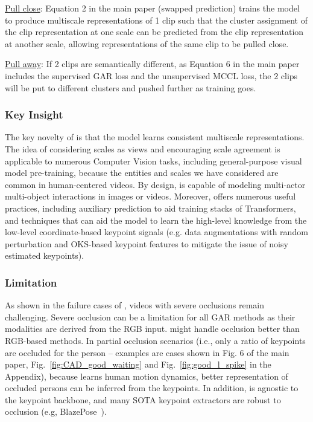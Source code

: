 \documentclass[runningheads]{llncs}
\begin{document}
\ul{Pull close}: Equation 2 in the main paper (swapped prediction)
trains the model to produce multiscale representations
of 1 clip such that the 
cluster assignment
of the clip representation at one scale can be predicted from the clip representation at another scale, allowing representations of the same clip to be pulled close.

\ul{Pull away}:
If 2 clips are semantically different,
as 
Equation 6 in the main paper
includes 
the supervised GAR loss and the unsupervised MCCL loss, the 2 clips  will be put
to different clusters
and
pushed 
further 
as training goes.







\subsubsection{Key Insight} 
The key novelty of \ours is that the model learns consistent multiscale representations. The idea of considering scales as views and encouraging scale agreement is applicable to numerous Computer Vision tasks, including general-purpose visual model pre-training, because the entities and scales we have considered are common in human-centered videos. By design, \ours is capable of modeling multi-actor multi-object interactions in images or videos. Moreover, \ours offers numerous useful practices, including  auxiliary prediction to aid training stacks of Transformers, and techniques that can aid the model to  learn the high-level knowledge from the low-level coordinate-based keypoint signals 
(e.g. data augmentations with random perturbation and OKS-based keypoint features to mitigate the issue of noisy estimated keypoints).

\subsubsection{Limitation}
As shown in the failure cases of \ourseos, videos with severe occlusions remain challenging. Severe occlusion can be a limitation for all GAR methods as their modalities are derived from the RGB input. 
\ours might handle occlusion better than RGB-based methods. In partial occlusion scenarios (i.e., only a ratio of keypoints are occluded for the person -- examples are cases shown in Fig. 6 of the main paper, Fig.~\ref{fig:CAD_good_waiting} and Fig.~\ref{fig:good_l_spike} in the Appendix), because \ours learns human motion dynamics, better representation of occluded persons can be inferred from the keypoints. In addition, \ours is agnostic to the keypoint backbone, and many SOTA keypoint extractors are robust to occlusion (e.g, BlazePose~\cite{bazarevsky2020blazepose,mediapipeBlazePose}). 
\end{document}
